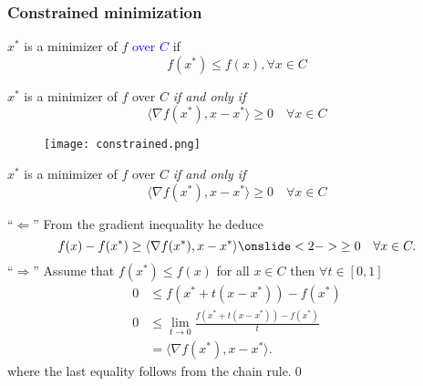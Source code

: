 \documentclass{beamer}
\begin{document}
\begin{frame}
  \frametitle{Constrained minimization}

  \begin{minipage}{0.5\textwidth}
    \begin{definition}
      $x^*$ is a minimizer of $f$ \textcolor{blue}{over $C$} if
      \begin{equation}
        f(x^*) \le f(x), \forall x \in C
      \end{equation}
    \end{definition}
    \begin{lemma}%
      $x^*$ is a minimizer of $f$ over $C$ \emph{if and only if}
      \begin{equation}
        \langle \nabla f(x^*), x-x^* \rangle \ge 0 \quad \forall x \in C
      \end{equation}
    \end{lemma}
  \end{minipage}
  \hfill
  \begin{minipage}{0.45\textwidth}
  \begin{figure}[ht]
    \centering
    \texttt{[image: constrained.png]}
  \end{figure}
  \end{minipage}
\end{frame}

\begin{frame}
  \begin{lemma}%
    $x^*$ is a minimizer of $f$ over $C$ \emph{if and only if}
    \begin{equation}
      \langle \nabla f(x^*), x-x^* \rangle \ge 0 \quad \forall x \in C
    \end{equation}
  \end{lemma}
  ``$\Leftarrow$'' From the gradient inequality he deduce
  \begin{equation}
    f(x) - f(x^*) \ge \langle \nabla f(x^*), x-x^* \rangle \onslide<2->{\ge 0} \quad \forall x \in C.
  \end{equation}
  ``$\Rightarrow$'' Assume that $f(x^*)\le f(x)$ for all $x \in C$ then $\forall t \in [0, 1]$
  \begin{equation}
    \begin{aligned}
      0 &\le f(x^* + t(x-x^*)) - f(x^*) \\
      0 &\le \lim_{t\to 0} \frac{f(x^* + t(x-x^*)) - f(x^*)}{t} \\
        &= \langle \nabla f(x^*), x-x^* \rangle.
    \end{aligned}
  \end{equation}
  where the last equality follows from the chain rule.\qed

\end{frame}
\end{document}
